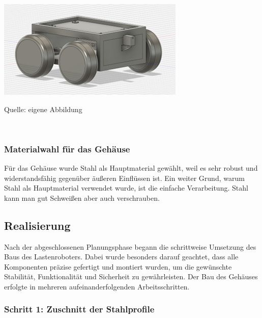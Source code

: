 \documentclass[ngerman,12pt,a4paper]{article}
\begin{document}
		\begin{center} 
			\begin{minipage}[t]{0.6\textwidth}
				\includegraphics{Pictures/modell-fertig}
				\label{fig:modell-fertig}
				\vspace{-10pt}
				\begin{center}
					\par\small Quelle: eigene Abbildung 
				\end{center}
			\end{minipage} \\[0.75cm]
		\end{center} 
	
		\subsubsection*{Materialwahl für das Gehäuse}
		Für das Gehäuse wurde Stahl als Hauptmaterial gewählt, weil es sehr robust und widerstandsfähig gegenüber äußeren Einflüssen ist. Ein weiter Grund, warum Stahl als Hauptmaterial verwendet wurde, ist die einfache Verarbeitung. Stahl kann man gut Schweißen aber auch verschrauben.
		
		\subsection{Realisierung} %
		Nach der abgeschlossenen Planungsphase begann die schrittweise Umsetzung des Baus des Lastenroboters. Dabei wurde besonders darauf geachtet, dass alle Komponenten präzise gefertigt und montiert wurden, um die gewünschte Stabilität, Funktionalität und Sicherheit zu gewährleisten. Der Bau des Gehäuses erfolgte in mehreren aufeinanderfolgenden Arbeitsschritten.
		
		\subsubsection*{Schritt 1: Zuschnitt der Stahlprofile}
		
\end{document}
